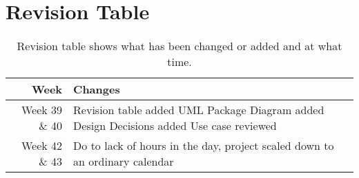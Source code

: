 \section{Revision Table}
\begin{table*}[ht]\centering
  \begin{tabularx}{\textwidth}{@{}rX@{}}
    \toprule
    \textbf{Week} & \textbf{Changes} \\\hline
    Week 39 \& 40 & Revision table added\newline  
		    		UML Package Diagram added\newline
		    		Design Decisions added\newline
		    		Use case reviewed\\\hline
	Week 42 \& 43 & Do to lack of hours in the day, project scaled down to an ordinary calendar \\
    \bottomrule
  \end{tabularx}
  \caption{Revision table shows what has been changed or added and at what time.}
  \label{glossary}\centering
\end{table*}
\newpage